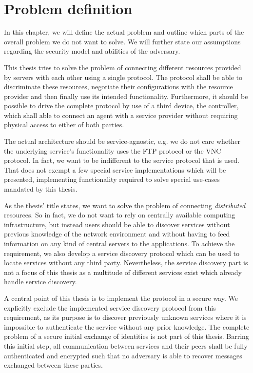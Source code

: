 \chapter{Problem definition}

In this chapter, we will define the actual problem and outline which parts of the overall problem we do not want to solve.
We will further state our assumptions regarding the security model and abilities of the adversary.

This thesis tries to solve the problem of connecting different resources provided by servers with each other using a single protocol.
The protocol shall be able to discriminate these resources, negotiate their configurations with the resource provider and then finally use its intended functionality.
Furthermore, it should be possible to drive the complete protocol by use of a third device, the controller, which shall able to connect an agent with a service provider without requiring physical access to either of both parties.

The actual architecture should be service-agnostic, e.g. we do not care whether the underlying service's functionality uses the FTP protocol or the VNC protocol.
In fact, we want to be indifferent to the service protocol that is used.
That does not exempt a few special service implementations which will be presented, implementing functionality required to solve special use-cases mandated by this thesis.

As the thesis' title states, we want to solve the problem of connecting \emph{distributed} resources.
So in fact, we do not want to rely on centrally available computing infrastructure, but instead users should be able to discover services without previous knowledge of the network environment and without having to feed information on  any kind of central servers to the applications.
To achieve the requirement, we also develop a service discovery protocol which can be used to locate services without any third party.
Nevertheless, the service discovery part is not a focus of this thesis as a multitude of different services exist which already handle service discovery.

A central point of this thesis is to implement the protocol in a secure way.
We explicitly exclude the implemented service discovery protocol from this requirement, as its purpose is to discover previously unknown services where it is impossible to authenticate the service without any prior knowledge.
The complete problem of a secure initial exchange of identities is not part of this thesis.
Barring this initial step, all communication between services and their peers shall be fully authenticated and encrypted such that no adversary is able to recover messages exchanged between these parties.

